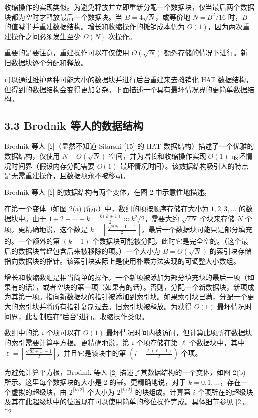 \documentclass[12pt,a4paper]{ctexart}
\theoremstyle{remark}
\begin{document}
收缩操作的实现类似。为避免释放并立即重新分配一个数据块，仅当最后两个数据块都为空时才释放最后一个数据块。当 $B=4\sqrt{N}$，或等价地 $N=B^2/16$ 时，$B$ 的值减半并重建数据结构。增长和收缩操作的摊销成本仍为 $O(1)$，因为两次重建操作之间必须发生至少 $\Omega(N)$ 次操作。

重要的是要注意，重建操作可以在仅使用 $O(\sqrt{N})$ 额外存储的情况下进行。新旧数据块逐个分配和释放。

可以通过维护两种可能大小的数据块并进行后台重建来去摊销化 HAT 数据结构，但得到的数据结构会变得更加复杂。下面描述一个具有最坏情况界的更简单数据结构。

\subsection{3.3 Brodnik 等人的数据结构}

Brodnik 等人 [2]（显然不知道 Sitarski [15] 的 HAT 数据结构）描述了一个优雅的数据结构，仅使用 $N+O(\sqrt{N})$ 空间，并为增长和收缩操作实现 $O(1)$ 最坏情况时间界（假设内存分配需要 $O(1)$ 最坏情况时间）。该数据结构吸引人的特点是无需重建操作，且数据项永不被移动。

Brodnik 等人 [2] 的数据结构有两个变体，在图 2 中示意性地描述。

在第一个变体（如图 2(a) 所示）中，数组的项按顺序存储在大小为 $1,2,3,\ldots$ 的数据块中。由于 $1+2+\cdots+k=\frac{k(k+1)}{2}\approx k^2/2$，需要大约 $\sqrt{2N}$ 个块来存储 $N$ 个项。更精确地说，这个数是 $k=\left\lceil\frac{\sqrt{8N+1}-1}{2}\right\rceil$。最后一个数据块可能只是部分填充的。一个额外的第 $(k+1)$ 个数据块可能被分配，此时它是完全空的。（这个最后的数据块曾经包含后来被移除的项。）一个大小为 $B=\Theta(\sqrt{N})$ 的索引块存储指向数据块的指针。该索引块实际上是使用朴素方法实现的可调整大小数组。

增长和收缩数组是相当简单的操作。一个新项被添加为部分填充块的最后一项（如果有的话），或者空块的第一项（如果有的话）。否则，分配一个新数据块，新项成为其第一项。指向新数据块的指针被添加到索引块。如果索引块已满，分配一个更大的索引块并将所有指针复制过去。旧索引块被释放。为获得 $O(1)$ 最坏情况时间界，此复制应在"后台"进行。收缩操作类似。

数组中的第 $i$ 个项可以在 $O(1)$ 最坏情况时间内被访问，但计算此项所在数据块的索引需要计算平方根。更精确地说，第 $i$ 个项存储在第 $\ell$ 个数据块中，其中 $\ell=\left\lceil\frac{\sqrt{8i+1}-1}{2}\right\rceil$，并且它是该块中的第 $(i-\frac{\ell(\ell-1)}{2})$ 个项。

为避免计算平方根，Brodnik 等人 [2] 描述了其数据结构的一个变体，如图 2(b) 所示。这里每个数据块的大小是 2 的幂。更精确地说，对于 $k=0,1,\ldots$，存在一个虚拟的超级块，由 $2^{\lceil k/2\rceil}$ 个大小为 $2^{\lfloor k/2\rfloor}$ 的块组成。计算第 $i$ 个项所在的超级块及其在此超级块中的位置现在可以使用简单的移位操作完成。具体细节参见 [2]。^2
\end{document}
